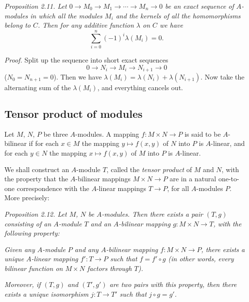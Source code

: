 
\noindent\textit{Proposition 2.11. Let $0\longrightarrow M_0\longrightarrow M_1\longrightarrow\cdots\longrightarrow M_n\longrightarrow0$ be an exact sequence of $A$-modules in which all the modules $M_i$ and the kernels of all the homomorphisms belong to $C$. Then for any additive function $\lambda$ on $C$ we have}
\[
 \sum_{i=0}^n(-1)^i\lambda(M_i)=0.
\]

\noindent\textit{Proof.} Split up the sequence into short exact sequences
\[
 0\longrightarrow N_i\longrightarrow M_i\longrightarrow N_{i+1}\longrightarrow0
\]
($N_0=N_{n+1}=0$). Then we have $\lambda(M_i)=\lambda(N_i)+\lambda(N_{i+1})$. Now take the alternating sum of the $\lambda(M_i)$, and everything cancels out. \proofbox

\subsection{Tensor product of modules}

Let $M$, $N$, $P$ be three $A$-modules. A mapping $f:M\times N\longrightarrow P$ is said to be $A$-bilinear if for each $x\in M$ the mapping $y\mapsto f(x,y)$ of $N$ into $P$ is $A$-linear, and for each $y\in N$ the mapping $x\mapsto f(x,y)$ of $M$ into $P$ is $A$-linear.

We shall construct an $A$-module $T$, called the \textit{tensor product} of $M$ and $N$, with the property that the $A$-bilinear mappings $M\times N\longrightarrow P$ are in a natural one-to-one correspondence with the $A$-linear mappings $T\longrightarrow P$, for all $A$-modules $P$. More precisely:

\noindent\textit{Proposition 2.12. Let $M$, $N$ be $A$-modules. Then there exists a pair $(T,g)$ consisting of an $A$-module $T$ and an $A$-bilinear mapping $g:M\times N\longrightarrow T$, with the following property:}

\textit{Given any $A$-module $P$ and any $A$-bilinear mapping $f:M\times N\longrightarrow P$, there exists a unique $A$-linear mapping $f':T\longrightarrow P$ such that $f=f'\circ g$ (in other words, every bilinear function on $M\times N$ factors through $T$).}

\textit{Moreover, if $(T,g)$ and $(T',g')$ are two pairs with this property, then there exists a unique isomorphism $j:T\longrightarrow T'$ such that $j\circ g=g'$.}

